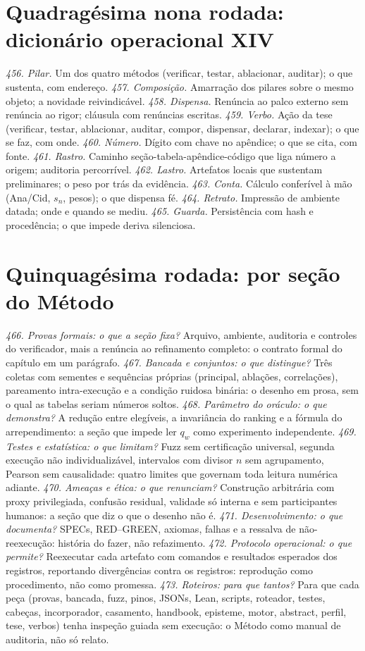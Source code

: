 \section{Quadragésima nona rodada: dicionário operacional XIV}
\textit{456. Pilar.} Um dos quatro métodos (verificar, testar, ablacionar, auditar); o que sustenta, com endereço.
\textit{457. Composição.} Amarração dos pilares sobre o mesmo objeto; a novidade reivindicável.
\textit{458. Dispensa.} Renúncia ao palco externo sem renúncia ao rigor; cláusula com renúncias escritas.
\textit{459. Verbo.} Ação da tese (verificar, testar, ablacionar, auditar, compor, dispensar, declarar, indexar); o que se faz, com onde.
\textit{460. Número.} Dígito com chave no apêndice; o que se cita, com fonte.
\textit{461. Rastro.} Caminho seção-tabela-apêndice-código que liga número a origem; auditoria percorrível.
\textit{462. Lastro.} Artefatos locais que sustentam preliminares; o peso por trás da evidência.
\textit{463. Conta.} Cálculo conferível à mão (Ana/Cid, $s_n$, pesos); o que dispensa fé.
\textit{464. Retrato.} Impressão de ambiente datada; onde e quando se mediu.
\textit{465. Guarda.} Persistência com hash e procedência; o que impede deriva silenciosa.
\section{Quinquagésima rodada: por seção do Método}
\textit{466. Provas formais: o que a seção fixa?} Arquivo, ambiente, auditoria e controles do verificador, mais a renúncia ao refinamento completo: o contrato formal do capítulo em um parágrafo.
\textit{467. Bancada e conjuntos: o que distingue?} Três coletas com sementes e sequências próprias (principal, ablações, correlações), pareamento intra-execução e a condição ruidosa binária: o desenho em prosa, sem o qual as tabelas seriam números soltos.
\textit{468. Parâmetro do oráculo: o que demonstra?} A redução entre elegíveis, a invariância do ranking e a fórmula do arrependimento: a seção que impede ler $q_w$ como experimento independente.
\textit{469. Testes e estatística: o que limitam?} Fuzz sem certificação universal, segunda execução não individualizável, intervalos com divisor $n$ sem agrupamento, Pearson sem causalidade: quatro limites que governam toda leitura numérica adiante.
\textit{470. Ameaças e ética: o que renunciam?} Construção arbitrária com proxy privilegiada, confusão residual, validade só interna e sem participantes humanos: a seção que diz o que o desenho não é.
\textit{471. Desenvolvimento: o que documenta?} SPECs, RED--GREEN, axiomas, falhas e a ressalva de não-reexecução: história do fazer, não refazimento.
\textit{472. Protocolo operacional: o que permite?} Reexecutar cada artefato com comandos e resultados esperados dos registros, reportando divergências contra os registros: reprodução como procedimento, não como promessa.
\textit{473. Roteiros: para que tantos?} Para que cada peça (provas, bancada, fuzz, pinos, JSONs, Lean, scripts, roteador, testes, cabeças, incorporador, casamento, handbook, episteme, motor, abstract, perfil, tese, verbos) tenha inspeção guiada sem execução: o Método como manual de auditoria, não só relato.
